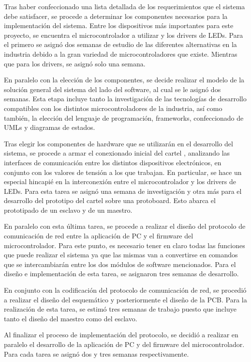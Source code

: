 Tras haber confeccionado una lista detallada de los requerimientos que el sistema debe satisfacer, se procede a determinar los componentes necesarios para la implementación del sistema.
Entre los dispositivos más importantes para este proyecto, se encuentra el microcontrolador a utilizar y los drivers de LEDs.
Para el primero se asignó dos semanas de estudio de las diferentes alternativas en la industria debido a la gran variedad de microcontroladores que existe. Mientras que para los drivers, se asignó solo una semana.

En paralelo con la elección de los componentes, se decide realizar el modelo de la solución general del sistema del lado del software, al cual se le asignó dos semanas. Esta etapa incluye tanto la investigación de las tecnologías de desarrollo compatibles con los distintos microcontroladores de la industria, así como también, la elección del lenguaje de programación, frameworks, confeccionado de UMLs y diagramas de estados.

Tras elegir los componentes de hardware que se utilizarán en el desarrollo del sistema, se procede a armar el conexionado inicial del cartel , analizando las interfaces de comunicación entre los distintos dispositivos electrónicos, en conjunto con los valores de tensión a los que trabajan.
En particular, se hace un especial hincapié en la interconexión entre el microcontrolador y los drivers de LEDs.
Para esta tarea se asignó una semana de investigación y otra más para el desarrollo del prototipo del cartel sobre una protoboard. Esto abarca el prototipado de un esclavo y de un maestro.

En paralelo con esta última tarea, se procede a realizar el diseño del protocolo de comunicación de red entre la aplicación de PC y el firmware del microcontrolador. Para este punto, es necesario tener en claro todas las funciones que puede realizar el sistema ya que las mismas van a convertirse en comandos que se intercambiarán entre los dos módulos de software mencionados. Para el diseño e implementación de esta tarea, se asignaron tres semanas de desarrollo.

En conjunto con la codificación del protocolo de comunicación de red, se procedió a realizar el diseño del esquemático y posteriormente el diseño de la PCB. Para la realización de esta tarea, se estimó tres semanas de trabajo puesto que incluye tanto el diseño del maestro como del esclavo.

Al finalizar el proceso de implementación del protocolo, se decidió a realizar en paralelo el desarrollo de la aplicación de PC y del firmware del microcontrolador. Para cada tarea se asignó dos y tres semanas respectivamente.

